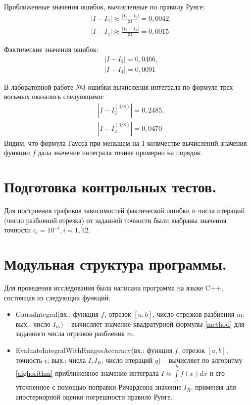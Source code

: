 \documentclass[a4paper, 12pt]{article}
\begin{document}
	Приближенные значения ошибок, вычисленные по правилу Рунге:
	\begin{equation*}
		\begin{aligned}
			&|I-I_2|\approx\frac{|I_1-I_2|}{31}=0,0042,\\
			&|I-I_4|\approx\frac{|I_2-I_4|}{31}=0,0015
		\end{aligned}
	\end{equation*}

	Фактические значения ошибок:
	\begin{equation*}
		\begin{aligned}
			&|I-I_2|=0,0466,\\
			&|I-I_4|=0,0091
		\end{aligned}
	\end{equation*}

	В лабораторной работе №3 ошибки вычисления интеграла по формуле трех восьмых оказались следующими:
	\begin{equation*}
		\begin{aligned}
			&|I-I_2^{(3/8)}|=0,2485,\\
			&|I-I_4^{(3/8)}|=0,0470
		\end{aligned}
	\end{equation*}
	Видим, что формула Гаусса при меньшем на 1 количестве вычислений значения функции $f$ дала значение интеграла точнее примерно на порядок.
	
	\section{Подготовка контрольных тестов.}
	
	Для построения графиков зависимостей фактической ошибки и числа итераций (число разбиений отрезка) от заданной точности были выбраны значения точности $\epsilon_i=10^{-i}, i=\overline{1,12}$. 
	
	\section{Модульная структура программы.}
	Для проведения исследования была написана программа на языке C++, состоящая из следующих функций:
	\begin{itemize}
		\item GaussIntegral(вх.: функция $f$, отрезок $[a,b]$, число отрезков разбиения $m$; вых.: число $I_m$) -- вычисляет значение квадратурной формулы \eqref{method} для заданного числа отрезков разбиения $m$.
		\item EvaluateIntegralWithRungesAccuracy(вх.: функция $f$, отрезок $[a,b]$, точность $\epsilon$; вых.: числа $I, I_R$, число итераций $q$) -- вычисляет по алгоритму \ref{alghorithm} приближенное значение интеграла $I\approx\int\limits_a^bf(x)dx$ и его уточненное с помощью поправки Ричардсона значение $I_R$, применяя для апостериорной оценки погрешности правило Рунге.
	\end{itemize}
	
\end{document}
